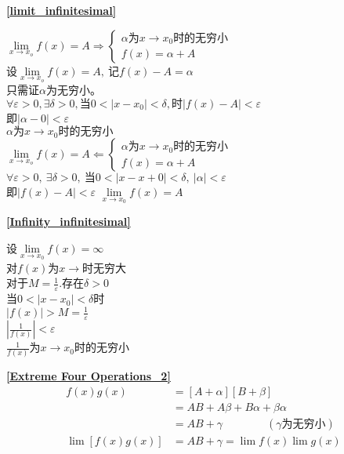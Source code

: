 \textbf{\large \ref{limit_infinitesimal}}
\begin{center}
   $\lim\limits_{x\to x_o}f(x)=A\Rightarrow \begin{cases}
    \alpha\mbox{为}x\rightarrow x_0 \mbox{时的无穷小}\\
    f(x)=\alpha+A
\end{cases}$\\
设$\lim\limits_{x\to x_o}f(x)=A,\ \mbox{记}f(x)-A=\alpha$\\
只需证$\alpha$为无穷小。\\
$\forall\varepsilon>0,\exists\delta>0,\mbox{当}0<\left|x-x_0\right|<\delta,\mbox{时}\left|f(x)-A\right|<\varepsilon$\\
即$\left|\alpha-0\right|<\varepsilon$\\
$\alpha\mbox{为}x\rightarrow x_0\mbox{时的无穷小}$\\
$\lim\limits_{x\to x_o}f(x)=A\Leftarrow \begin{cases}
    \alpha\mbox{为}x\rightarrow x_0 \mbox{时的无穷小}\\
    f(x)=\alpha+A
\end{cases}$\\
$\forall \varepsilon >0,\ \exists \delta >0,\ \mbox{当}0<\left|x-x+0\right|<\delta,\ \left|\alpha\right|<\varepsilon$\\
$\mbox{即}\left|f(x)-A\right|<\varepsilon$
$\lim\limits_{x\to x_0}f(x)=A$
\end{center}


\textbf{\large \ref{Infinity_infinitesimal}}
\begin{center}
    设$\lim\limits_{x\to x_0}f(x)=\infty$\\
对$f(x)$为$x\rightarrow$时无穷大\\
对于$M=\frac{1}{\varepsilon}$.存在$\delta>0$\\
当$0<\left|x-x_0\right|<\delta$时\\
$\left|f(x)\right|>M=\frac{1}{\varepsilon}$\\
$\left|\frac{1}{f(x)}\right|<\varepsilon$\\
$\frac{1}{f(x)}$为$x\rightarrow x_0$时的无穷小
\end{center}

\textbf{\large \ref{Extreme Four Operations_2}}
\begin{displaymath}
    \begin{split}
        f(x)g(x)&=\left[A+\alpha\right]\left[B+\beta\right]\\
        &=AB+A\beta+B\alpha+\beta\alpha\\
        &=AB+\gamma\qquad\qquad(\gamma\mbox{为无穷小})\\
        \lim\left[f(x)g(x)\right]&=AB+\gamma=\lim f(x)\lim g(x)
    \end{split}
\end{displaymath}

